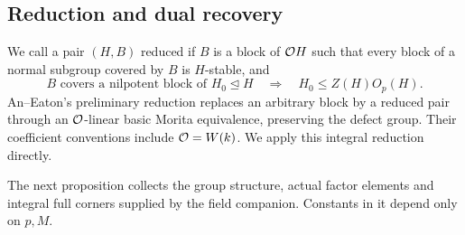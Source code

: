 \subsection{Reduction and dual recovery}

We call a pair $(H,B)$ reduced if $B$ is a block of $\mathcal O H$ such
that every block of a normal subgroup covered by $B$ is $H$-stable,
and
\begin{equation}\label{eq:reduced}
 B\text{ covers a nilpotent block of }H_0\trianglelefteq H
 \quad\Longrightarrow\quad H_0\leq Z(H)O_p(H).
\end{equation}
An--Eaton's preliminary reduction
\cite[Proposition~6.1]{AnEaton2025} replaces an arbitrary block by a
reduced pair through an $\mathcal O$-linear basic Morita equivalence,
preserving the defect group.  Their coefficient conventions include
$\mathcal O=W(k)$.  We apply this integral reduction directly.

The next proposition collects the group structure, actual factor
elements and integral full corners supplied by the field companion.
Constants in it depend only on $p,M$.

